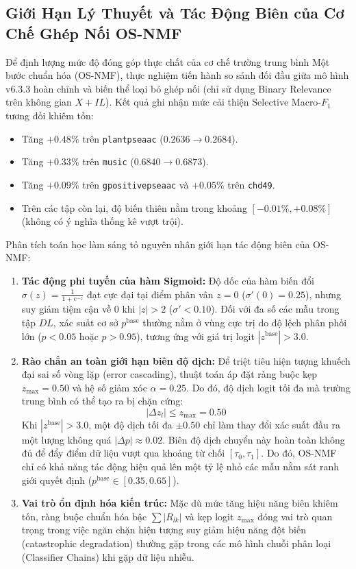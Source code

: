 \documentclass[10pt,a4paper]{article}
\begin{document}
\subsection{Giới Hạn Lý Thuyết và Tác Động Biên của Cơ Chế Ghép Nối OS-NMF}
Để định lượng mức độ đóng góp thực chất của cơ chế trường trung bình Một bước chuẩn hóa (OS-NMF), thực nghiệm tiến hành so sánh đối đầu giữa mô hình v6.3.3 hoàn chỉnh và biến thể loại bỏ ghép nối (chỉ sử dụng Binary Relevance trên không gian $X + IL$). Kết quả ghi nhận mức cải thiện Selective Macro-$F_1$ tương đối khiêm tốn:
\begin{itemize}[leftmargin=*]
    \item Tăng $+0.48\%$ trên \texttt{plantpseaac} ($0.2636 \to 0.2684$).
    \item Tăng $+0.33\%$ trên \texttt{music} ($0.6840 \to 0.6873$).
    \item Tăng $+0.09\%$ trên \texttt{gpositivepseaac} và $+0.05\%$ trên \texttt{chd49}.
    \item Trên các tập còn lại, độ biến thiên nằm trong khoảng $[-0.01\%, +0.08\%]$ (không có ý nghĩa thống kê vượt trội).
\end{itemize}

Phân tích toán học làm sáng tỏ nguyên nhân giới hạn tác động biên của OS-NMF:
\begin{enumerate}[leftmargin=*]
    \item \textbf{Tác động phi tuyến của hàm Sigmoid:} Độ dốc của hàm biến đổi $\sigma(z) = \frac{1}{1 + e^{-z}}$ đạt cực đại tại điểm phân vân $z=0$ ($\sigma'(0) = 0.25$), nhưng suy giảm tiệm cận về 0 khi $|z| > 2$ ($\sigma' < 0.10$). Đối với đa số các mẫu trong tập $DL$, xác suất cơ sở $p^{\text{base}}$ thường nằm ở vùng cực trị do độ lệch phân phối lớn ($p < 0.05$ hoặc $p > 0.95$), tương ứng với giá trị logit $|z^{\text{base}}| > 3.0$.
    \item \textbf{Rào chắn an toàn giới hạn biên độ dịch:} Để triệt tiêu hiện tượng khuếch đại sai số vòng lặp (error cascading), thuật toán áp đặt ràng buộc kẹp $z_{\max} = 0.50$ và hệ số giảm xóc $\alpha = 0.25$. Do đó, độ dịch logit tối đa mà trường trung bình có thể tạo ra bị chặn cứng:
    \begin{equation}
        |\Delta z_l| \le z_{\max} = 0.50
    \end{equation}
    Khi $|z^{\text{base}}| > 3.0$, một độ dịch tối đa $\pm 0.50$ chỉ làm thay đổi xác suất đầu ra một lượng không quá $|\Delta p| \approx 0.02$. Biên độ dịch chuyển này hoàn toàn không đủ để đẩy điểm dữ liệu vượt qua khoảng từ chối $[\tau_0, \tau_1]$. Do đó, OS-NMF chỉ có khả năng tác động hiệu quả lên một tỷ lệ nhỏ các mẫu nằm sát ranh giới quyết định ($p^{\text{base}} \in [0.35, 0.65]$).
    \item \textbf{Vai trò ổn định hóa kiến trúc:} Mặc dù mức tăng hiệu năng biên khiêm tốn, ràng buộc chuẩn hóa bậc $\sum |R_{lk}|$ và kẹp logit $z_{\max}$ đóng vai trò quan trọng trong việc ngăn chặn hiện tượng suy giảm hiệu năng đột biến (catastrophic degradation) thường gặp trong các mô hình chuỗi phân loại (Classifier Chains) khi gặp dữ liệu nhiễu.
\end{enumerate}
\end{document}
